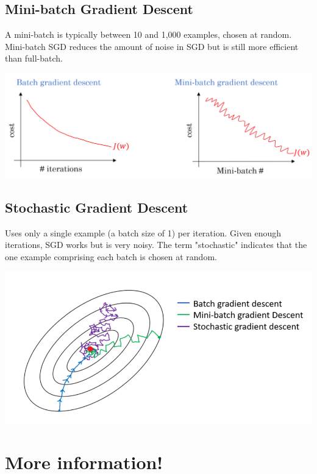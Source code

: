 \documentclass{42-en}
\begin{document}
\subsection*{Mini-batch Gradient Descent}
A mini-batch is typically between 10 and 1,000 examples, chosen at random. Mini-batch SGD reduces the amount of noise in SGD but is still more efficient than full-batch.\\
\centerline{\includegraphics[width=150mm]{images/batch_grad_desc.png}}
\subsection*{Stochastic Gradient Descent}
Uses only a single example (a batch size of 1) per iteration. Given enough iterations, SGD works but is very noisy. The term "stochastic" indicates that the one example comprising each batch is chosen at random.\\
\centerline{\includegraphics[width=150mm]{images/batch_disc.png}}

\section*{More information!}
\end{document}
